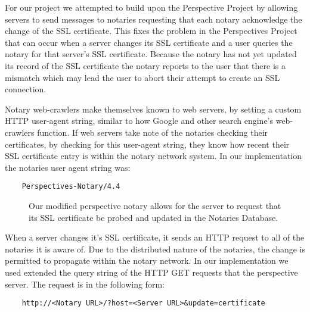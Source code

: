\documentclass[preprint,review,12pt]{elsarticle}
\begin{document}
For our project we attempted to build upon the Perspective Project by allowing
servers to send messages to notaries requesting that each notary acknowledge
the change of the SSL certificate. This fixes the problem in the Perspectives
Project that can occur when a server changes its SSL certificate and a user
queries the notary for that server's SSL certificate. Because the notary has
not yet updated its record of the SSL certificate the notary reports to the user that
there is a mismatch which may lead the user to abort their attempt to create an
SSL connection.

Notary web-crawlers make themselves known to web servers, by setting a custom
HTTP user-agent string, similar to how Google and other search engine's
web-crawlers function. If web servers take note of the notaries checking their
certificates, by checking for this user-agent string, they know how recent
their SSL certificate entry is within the notary network system. In our
implementation the notaries user agent string was:

\begin{verbatim}
    Perspectives-Notary/4.4
\end{verbatim}

\begin{figure}[h]
\caption{Our modified perspective notary allows for the server to request that
    its SSL certificate be probed and updated in the Notaries Database.}
\end{figure}

When a server changes it's SSL certificate, it sends an HTTP request to all of
the notaries it is aware of. Due to the distributed nature of the notaries, the
change is permitted to propagate within the notary network. In our
implementation we used extended the query string of the HTTP GET requests that
the perspective server. The request is in the following form:

\begin{verbatim}
    http://<Notary URL>/?host=<Server URL>&update=certificate
\end{verbatim}
\end{document}
